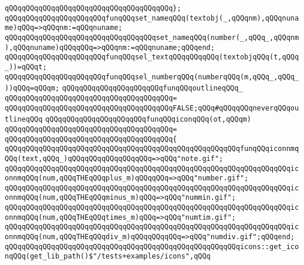 \verb|qQQqqQQqqQQqqQQqqQQqqQQqqQQqqQQqqQQqqQQq};|\newline
\newline
\verb|qQQqqQQqqQQqqQQqqQQqqQQqfunqQQqset_nameqQQq(textobj(_,qQQqnm),qQQqnuname)qQQq=>qQQqnm:=qQQqnuname;|\newline
\verb|qQQqqQQqqQQqqQQqqQQqqQQqqQQqqQQqqQQqset_nameqQQq(number(_,qQQq_,qQQqnm),qQQqnuname)qQQqqQQq=>qQQqnm:=qQQqnuname;qQQqend;|\newline
\newline
\verb|qQQqqQQqqQQqqQQqqQQqqQQqfunqQQqsel_textqQQqqQQqqQQq(textobjqQQq(t,qQQq_))=qQQqt;|\newline
\verb|qQQqqQQqqQQqqQQqqQQqqQQqfunqQQqsel_numberqQQq(numberqQQq(m,qQQq_,qQQq_))qQQq=qQQqm;|\newline
\newline
\verb|qQQqqQQqqQQqqQQqqQQqqQQqfunqQQqoutlineqQQq_|\newline
\verb|qQQqqQQqqQQqqQQqqQQqqQQqqQQqqQQqqQQqqQQq=|\newline
\verb|qQQqqQQqqQQqqQQqqQQqqQQqqQQqqQQqqQQqqQQqFALSE;qQQq#qQQqqQQqneverqQQqoutlineqQQq|\newline
\newline
\verb|qQQqqQQqqQQqqQQqqQQqqQQqfunqQQqiconqQQq(ot,qQQqm)|\newline
\verb|qQQqqQQqqQQqqQQqqQQqqQQqqQQqqQQqqQQqqQQq=|\newline
\verb|qQQqqQQqqQQqqQQqqQQqqQQqqQQqqQQqqQQqqQQq{|\newline
\verb|qQQqqQQqqQQqqQQqqQQqqQQqqQQqqQQqqQQqqQQqqQQqqQQqqQQqqQQqfunqQQqiconnmqQQq(text,qQQq_)qQQqqQQqqQQqqQQqqQQq=>qQQq"note.gif";|\newline
\verb|qQQqqQQqqQQqqQQqqQQqqQQqqQQqqQQqqQQqqQQqqQQqqQQqqQQqqQQqqQQqqQQqqQQqiconnmqQQq(num,qQQqTHEqQQqplus_m)qQQqqQQq=>qQQq"number.gif";|\newline
\verb|qQQqqQQqqQQqqQQqqQQqqQQqqQQqqQQqqQQqqQQqqQQqqQQqqQQqqQQqqQQqqQQqqQQqiconnmqQQq(num,qQQqTHEqQQqminus_m)qQQq=>qQQq"nummin.gif";|\newline
\verb|qQQqqQQqqQQqqQQqqQQqqQQqqQQqqQQqqQQqqQQqqQQqqQQqqQQqqQQqqQQqqQQqqQQqiconnmqQQq(num,qQQqTHEqQQqtimes_m)qQQq=>qQQq"numtim.gif";|\newline
\verb|qQQqqQQqqQQqqQQqqQQqqQQqqQQqqQQqqQQqqQQqqQQqqQQqqQQqqQQqqQQqqQQqqQQqiconnmqQQq(num,qQQqTHEqQQqdiv_m)qQQqqQQqqQQq=>qQQq"numdiv.gif";qQQqend;|\newline
\newline
\verb|qQQqqQQqqQQqqQQqqQQqqQQqqQQqqQQqqQQqqQQqqQQqqQQqqQQqqQQqicons::get_iconqQQq(get_lib_path()$"/tests+examples/icons",qQQq|\newline
